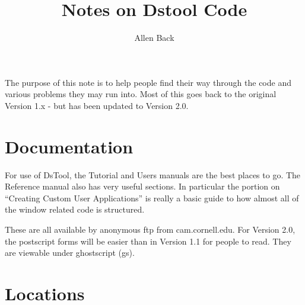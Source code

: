 

\title{Notes on Dstool Code }
\author{Allen Back}



\maketitle


The purpose of this note is to help people find their
way through the code and various problems they may run into. 
Most of this goes back to the original Version 1.x - but  has been
updated to Version 2.0.

\section{Documentation}

For use of DsTool, the Tutorial and Users manuals are the best 
places to go. The Reference manual also has very useful sections. 
In particular the portion on
``Creating Custom User Applications'' is really a basic guide to how almost all
of the window related code is structured.

These are all available by anonymous ftp from cam.cornell.edu. For Version
2.0, the postscript forms will be easier than in Version 1.1
for people to read. They are viewable under ghostscript (gs).

\section{Locations}

